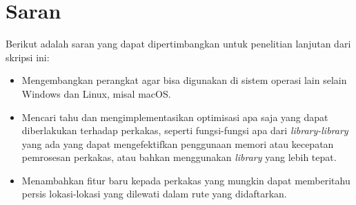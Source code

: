 \section{Saran}
\label{chap:conclusion-feedbacks}

Berikut adalah saran yang dapat dipertimbangkan untuk penelitian lanjutan dari skripsi ini:

\begin{itemize}
	\item Mengembangkan perangkat agar bisa digunakan di sistem operasi lain selain Windows dan Linux, misal macOS.
	\item Mencari tahu dan mengimplementasikan optimisasi apa saja yang dapat diberlakukan terhadap perkakas, seperti fungsi-fungsi apa dari \textit{library-library} yang ada yang dapat mengefektifkan penggunaan memori atau kecepatan pemrosesan perkakas, atau bahkan menggunakan \textit{library} yang lebih tepat.
	\item Menambahkan fitur baru kepada perkakas yang mungkin dapat memberitahu persis lokasi-lokasi yang dilewati dalam rute yang didaftarkan.
\end{itemize}